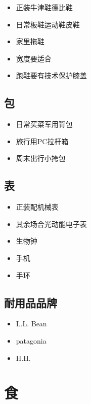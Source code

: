 \documentclass[
  letterpaper,
  DIV=11,
  numbers=noendperiod]{scrreprt}
\providecommand{\tightlist}{%
  \setlength{\itemsep}{0pt}\setlength{\parskip}{0pt}}\usepackage{longtable,booktabs,array}
\begin{document}
\begin{itemize}
\tightlist
\item
  正装牛津鞋德比鞋
\item
  日常板鞋运动鞋皮鞋
\item
  家里拖鞋
\item
  宽度要适合
\item
  跑鞋要有技术保护膝盖
\end{itemize}

\section{包}\label{ux5305}

\begin{itemize}
\tightlist
\item
  日常买菜军用背包
\item
  旅行用PC拉杆箱
\item
  周末出行小挎包
\end{itemize}

\section{表}\label{ux8868}

\begin{itemize}
\tightlist
\item
  正装配机械表
\item
  其余场合光动能电子表
\item
  生物钟
\item
  手机
\item
  手环
\end{itemize}

\section{耐用品品牌}\label{ux8010ux7528ux54c1ux54c1ux724c}

\begin{itemize}
\tightlist
\item
  L.L. Bean
\item
  patagonia
\item
  H.H.
\end{itemize}


\chapter{食}\label{ux98df}
\end{document}
